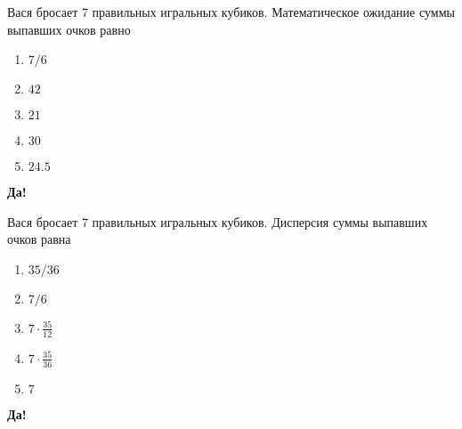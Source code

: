 \documentclass[t]{beamer}
\begin{document}
 \begin{frame} \label{9-Yes} 
\begin{block}{9} 

Вася бросает 7 правильных игральных кубиков. Математическое ожидание суммы выпавших очков равно
     


 \end{block} 
\begin{enumerate} 
\item[] \hyperlink{9-No}{\beamergotobutton{} $7/6$}
\item[] \hyperlink{9-No}{\beamergotobutton{} $42$
}
\item[] \hyperlink{9-No}{\beamergotobutton{} $21$}
\item[] \hyperlink{9-No}{\beamergotobutton{} $30$}
\item[] \hyperlink{9-Yes}{\beamergotobutton{} $24.5$}
\end{enumerate} 

 \textbf{Да!} 
 \hyperlink{10}{}\end{frame} 


 \begin{frame} \label{10-Yes} 
\begin{block}{10} 

Вася бросает 7 правильных игральных кубиков. Дисперсия суммы выпавших очков равна
 


 \end{block} 
\begin{enumerate} 
\item[] \hyperlink{10-No}{\beamergotobutton{} $35/36$}
\item[] \hyperlink{10-No}{\beamergotobutton{} $7/6$}
\item[] \hyperlink{10-Yes}{\beamergotobutton{} $7\cdot\frac{35}{12}$}
\item[] \hyperlink{10-No}{\beamergotobutton{} $7\cdot \frac{35}{36}$}
\item[] \hyperlink{10-No}{\beamergotobutton{} $7$}
\end{enumerate} 

 \textbf{Да!} 
 \hyperlink{11}{}\end{frame} 
\end{document}
